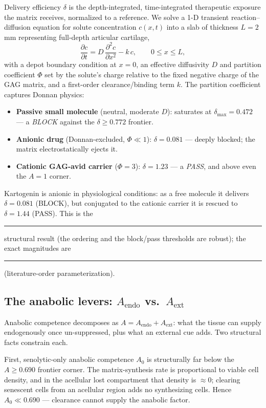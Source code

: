 \documentclass[11pt,a4paper]{article}
\newcommand{\tierdisc}[1]{\textcolor{#1}{\rule[0.05ex]{1.0ex}{1.0ex}}}
\newcommand{\tierGreen}{\tierdisc{green!60!black}} %
\newcommand{\tierOrange}{\tierdisc{orange!90!black}} %
\begin{document}
Delivery efficiency $\delta$ is the depth-integrated, time-integrated therapeutic
exposure the matrix receives, normalized to a reference. We solve a 1-D transient
reaction--diffusion equation for solute concentration $c(x,t)$ into a slab of
thickness $L=2$\,mm representing full-depth articular cartilage,
\begin{equation}
  \frac{\partial c}{\partial t}
  = D\,\frac{\partial^2 c}{\partial x^2} - k\,c ,
  \qquad 0 \le x \le L ,
\end{equation}
with a depot boundary condition at $x=0$, an effective diffusivity $D$ and
partition coefficient $\Phi$ set by the solute's charge relative to the fixed
negative charge of the GAG matrix, and a first-order clearance/binding term $k$.
The partition coefficient captures Donnan physics:
\begin{itemize}
  \item \textbf{Passive small molecule} (neutral, moderate $D$): saturates at
  $\delta_{\max}=0.472$ --- a \emph{BLOCK} against the $\delta\ge0.772$ frontier.
  \item \textbf{Anionic drug} (Donnan-excluded, $\Phi\!\ll\!1$): $\delta=0.081$
  --- deeply blocked; the matrix electrostatically ejects it.
  \item \textbf{Cationic GAG-avid carrier} ($\Phi=3$): $\delta=1.23$ --- a
  \emph{PASS}, and above even the $A=1$ corner.
\end{itemize}
Kartogenin is anionic in physiological conditions: as a free molecule it delivers
$\delta=0.081$ (BLOCK), but conjugated to the cationic carrier it is rescued to
$\delta=1.44$ (PASS). This is the \tierGreen{} structural result (the ordering and
the block/pass thresholds are robust); the exact magnitudes are \tierOrange{}
(literature-order parameterization).

\subsection{The anabolic levers: $A_{\mathrm{endo}}$ vs.\ $A_{\mathrm{ext}}$}
\label{sec:anabolic}

Anabolic competence decomposes as $A = A_{\mathrm{endo}} + A_{\mathrm{ext}}$: what
the tissue can supply endogenously once un-suppressed, plus what an external cue
adds. Two structural facts constrain each.

First, senolytic-only anabolic competence $A_0$ is structurally far below the
$A\ge0.690$ frontier corner. The matrix-synthesis rate is proportional to viable
cell density, and in the acellular lost compartment that density is $\approx0$;
clearing senescent cells from an acellular region adds no synthesizing cells.
Hence $A_0 \ll 0.690$ --- clearance cannot supply the anabolic factor.
\end{document}
